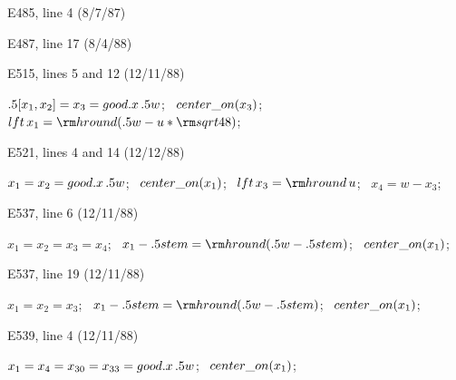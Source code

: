 \bugonpage E485, line 4 (8/7/87)

\ninepoint\noindent[Delete the `$=$' sign between `\\{lft}' and `$x_5$'.]

\bugonpage E487, line 17 (8/4/88)

\ninepoint{}
\smallskip{}

\bugonpage E515, lines 5 and 12 (12/11/88)

\ninepoint\noindent
$.5[x_1,x_2]=x_3=\\{good}.x\,.5w$; \
$\\{center\_on}(x_3)$; \ $\\{lft}\,x_1={\rm hround}(.5w-u*{\rm sqrt}48)$;

\bugonpage E521, lines 4 and 14 (12/12/88)

\ninepoint\noindent
$x_1=x_2=\\{good}.x\,.5w$; \
$\\{center\_on}(x_1)$; \ $\\{lft}\,x_3={\rm hround}\,u$; \ $x_4=w-x_3$;

\bugonpage E537, line 6 (12/11/88)

\ninepoint\noindent
$x_1=x_2=x_3=x_4$; \
$x_1-.5\\{stem}={\rm hround}(.5w-.5\\{stem})$; \
$\\{center\_on}(x_1)$;

\bugonpage E537, line 19 (12/11/88)

\ninepoint\noindent
$x_1=x_2=x_3$; \
$x_1-.5\\{stem}={\rm hround}(.5w-.5\\{stem})$; \
$\\{center\_on}(x_1)$;

\bugonpage E539, line 4 (12/11/88)

\ninepoint\noindent
$x_1=x_4=x_{30}=x_{33}=\\{good}.x\,.5w$; \ $\\{center\_on}(x_1)$;

